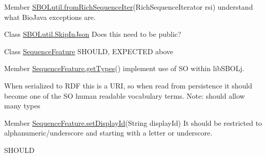 \label{todo__todo000005}
\hypertarget{todo__todo000005}{}
 
\begin{DoxyDescription}
\item[Member \hyperlink{classorg_1_1sbolstandard_1_1lib_s_b_o_lj_1_1_s_b_o_lutil_a375e674a9edc77307e250df41d76f02d}{SBOLutil.fromRichSequenceIter}(RichSequenceIterator rsi) ]understand what BioJava exceptions are. 
\end{DoxyDescription}

\label{todo__todo000006}
\hypertarget{todo__todo000006}{}
 
\begin{DoxyDescription}
\item[Class \hyperlink{interfaceorg_1_1sbolstandard_1_1lib_s_b_o_lj_1_1_s_b_o_lutil_1_1_skip_in_json}{SBOLutil.SkipInJson} ]Does this need to be public?
\end{DoxyDescription}

\label{todo__todo000007}
\hypertarget{todo__todo000007}{}
 
\begin{DoxyDescription}
\item[Class \hyperlink{classorg_1_1sbolstandard_1_1lib_s_b_o_lj_1_1_sequence_feature}{SequenceFeature} ]SHOULD, EXPECTED above
\end{DoxyDescription}

\label{todo__todo000009}
\hypertarget{todo__todo000009}{}
 
\begin{DoxyDescription}
\item[Member \hyperlink{classorg_1_1sbolstandard_1_1lib_s_b_o_lj_1_1_sequence_feature_a518b97368db3de477d5fb57150d8b711}{SequenceFeature.getTypes}() ]implement use of SO within libSBOLj. 

When serialized to RDF this is a URI, so when read from persistence it should become one of the SO human readable vocabulary terms. Note: should allow many types 
\end{DoxyDescription}

\label{todo__todo000008}
\hypertarget{todo__todo000008}{}
 
\begin{DoxyDescription}
\item[Member \hyperlink{classorg_1_1sbolstandard_1_1lib_s_b_o_lj_1_1_sequence_feature_a46b93a70e7bd612a7b429aac4829bc88}{SequenceFeature.setDisplayId}(String displayId) ]It should be restricted to alphanumeric/underscore and starting with a letter or underscore. 

SHOULD 
\end{DoxyDescription}